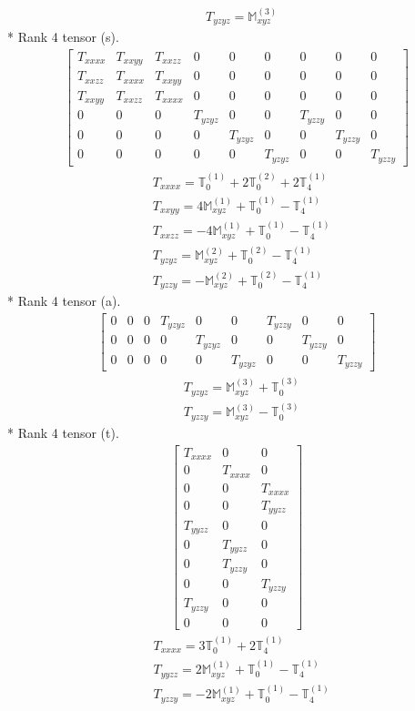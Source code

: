 \documentclass[fleqn,8pt,landscape]{jsarticle}
\begin{document}
\begin{align*}
& T_{yzyz} = \mathbb{M}_{xyz}^{(3)}
\end{align*}
* Rank 4 tensor (s).
\begin{align*}
\begin{bmatrix} T_{xxxx} & T_{xxyy} & T_{xxzz} & 0 & 0 & 0 & 0 & 0 & 0 \\ T_{xxzz} & T_{xxxx} & T_{xxyy} & 0 & 0 & 0 & 0 & 0 & 0 \\ T_{xxyy} & T_{xxzz} & T_{xxxx} & 0 & 0 & 0 & 0 & 0 & 0 \\ 0 & 0 & 0 & T_{yzyz} & 0 & 0 & T_{yzzy} & 0 & 0 \\ 0 & 0 & 0 & 0 & T_{yzyz} & 0 & 0 & T_{yzzy} & 0 \\ 0 & 0 & 0 & 0 & 0 & T_{yzyz} & 0 & 0 & T_{yzzy} \end{bmatrix}
\end{align*}
\begin{align*}
& T_{xxxx} = \mathbb{T}_{0}^{(1)} + 2 \mathbb{T}_{0}^{(2)} + 2 \mathbb{T}_{4}^{(1)} \\
& T_{xxyy} = 4 \mathbb{M}_{xyz}^{(1)} + \mathbb{T}_{0}^{(1)} - \mathbb{T}_{4}^{(1)} \\
& T_{xxzz} = - 4 \mathbb{M}_{xyz}^{(1)} + \mathbb{T}_{0}^{(1)} - \mathbb{T}_{4}^{(1)} \\
& T_{yzyz} = \mathbb{M}_{xyz}^{(2)} + \mathbb{T}_{0}^{(2)} - \mathbb{T}_{4}^{(1)} \\
& T_{yzzy} = - \mathbb{M}_{xyz}^{(2)} + \mathbb{T}_{0}^{(2)} - \mathbb{T}_{4}^{(1)}
\end{align*}
* Rank 4 tensor (a).
\begin{align*}
\begin{bmatrix} 0 & 0 & 0 & T_{yzyz} & 0 & 0 & T_{yzzy} & 0 & 0 \\ 0 & 0 & 0 & 0 & T_{yzyz} & 0 & 0 & T_{yzzy} & 0 \\ 0 & 0 & 0 & 0 & 0 & T_{yzyz} & 0 & 0 & T_{yzzy} \end{bmatrix}
\end{align*}
\begin{align*}
& T_{yzyz} = \mathbb{M}_{xyz}^{(3)} + \mathbb{T}_{0}^{(3)} \\
& T_{yzzy} = \mathbb{M}_{xyz}^{(3)} - \mathbb{T}_{0}^{(3)}
\end{align*}
* Rank 4 tensor (t).
\begin{align*}
\begin{bmatrix} T_{xxxx} & 0 & 0 \\ 0 & T_{xxxx} & 0 \\ 0 & 0 & T_{xxxx} \\ 0 & 0 & T_{yyzz} \\ T_{yyzz} & 0 & 0 \\ 0 & T_{yyzz} & 0 \\ 0 & T_{yzzy} & 0 \\ 0 & 0 & T_{yzzy} \\ T_{yzzy} & 0 & 0 \\ 0 & 0 & 0 \end{bmatrix}
\end{align*}
\begin{align*}
& T_{xxxx} = 3 \mathbb{T}_{0}^{(1)} + 2 \mathbb{T}_{4}^{(1)} \\
& T_{yyzz} = 2 \mathbb{M}_{xyz}^{(1)} + \mathbb{T}_{0}^{(1)} - \mathbb{T}_{4}^{(1)} \\
& T_{yzzy} = - 2 \mathbb{M}_{xyz}^{(1)} + \mathbb{T}_{0}^{(1)} - \mathbb{T}_{4}^{(1)}
\end{align*}
\end{document}
